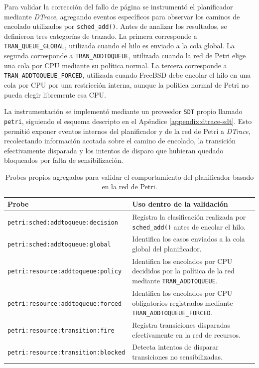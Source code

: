 Para validar la corrección del fallo de página se instrumentó el planificador mediante \textit{DTrace}, agregando eventos específicos para observar los caminos de encolado utilizados por \verb|sched_add()|. Antes de analizar los resultados, se definieron tres categorías de trazado. La primera corresponde a \verb|TRAN_QUEUE_GLOBAL|, utilizada cuando el hilo es enviado a la cola global. La segunda corresponde a \verb|TRAN_ADDTOQUEUE|, utilizada cuando la red de Petri elige una cola por CPU mediante su política normal. La tercera corresponde a \verb|TRAN_ADDTOQUEUE_FORCED|, utilizada cuando FreeBSD debe encolar el hilo en una cola por CPU por una restricción interna, aunque la política normal de Petri no pueda elegir libremente esa CPU.\par

La instrumentación se implementó mediante un proveedor \verb|SDT| propio llamado \verb|petri|, siguiendo el esquema descripto en el Apéndice \ref{appendix:dtrace-sdt}. Esto permitió exponer eventos internos del planificador y de la red de Petri a \textit{DTrace}, recolectando información acotada sobre el camino de encolado, la transición efectivamente disparada y los intentos de disparo que hubieran quedado bloqueados por falta de sensibilización.\par

\begin{table}[H]
    \centering
    \begin{tabular}{|p{}|p{}|}
        \hline
        \textbf{Probe} & \textbf{Uso dentro de la validación} \\
        \hline
        \verb|petri:sched:addtoqueue:decision| & Registra la clasificación realizada por \verb|sched_add()| antes de encolar el hilo. \\
        \hline
        \verb|petri:sched:addtoqueue:global| & Identifica los casos enviados a la cola global del planificador. \\
        \hline
        \verb|petri:resource:addtoqueue:policy| & Identifica los encolados por CPU decididos por la política de la red mediante \verb|TRAN_ADDTOQUEUE|. \\
        \hline
        \verb|petri:resource:addtoqueue:forced| & Identifica los encolados por CPU obligatorios registrados mediante \verb|TRAN_ADDTOQUEUE_FORCED|. \\
        \hline
        \verb|petri:resource:transition:fire| & Registra transiciones disparadas efectivamente en la red de recursos. \\
        \hline
        \verb|petri:resource:transition:blocked| & Detecta intentos de disparar transiciones no sensibilizadas. \\
        \hline
    \end{tabular}
    \caption[Probes DTrace agregados para la red de Petri]{Probes propios agregados para validar el comportamiento del planificador basado en la red de Petri.}
    \label{tabla:petri-dtrace-probes}
\end{table}

